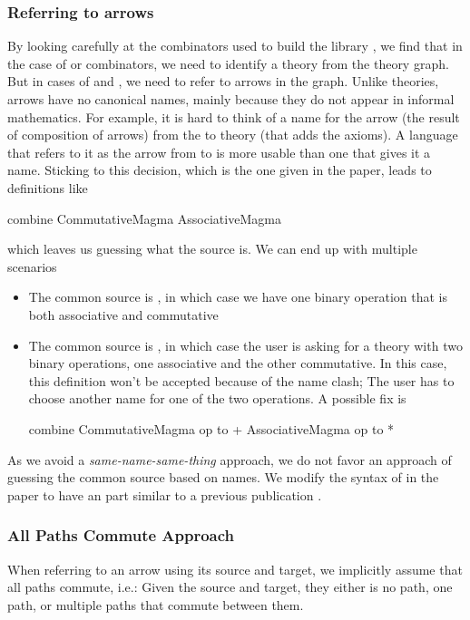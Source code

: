 \subsubsection{Referring to arrows}
By looking carefully at the combinators used to build the library , we find that in the case of  or  combinators, we need to identify a theory from the theory graph. But in cases of  and , we need to refer to arrows in the graph. Unlike theories, arrows have no canonical names, mainly because they do not appear in informal mathematics. For example, it is hard to think of a name for the arrow (the result of composition of arrows) from the  to  theory (that adds the axioms). A language that refers to it as the arrow from  to  is more usable than one that gives it a name. Sticking to this decision, which is the one given in the paper, leads to definitions like 
\begin{togcode}
combine CommutativeMagma {} AssociativeMagma {}
\end{togcode}
which leaves us guessing what the source is. We can end up with multiple scenarios 
\begin{itemize}
    \item The common source is , in which case we have one binary operation that is both associative and commutative 
    \item The common source is , in which case the user is asking for a theory with two binary operations, one associative and the other commutative. In this case, this definition won't be accepted because of the name clash; The user has to choose another name for one of the two operations. A possible fix is 
    \begin{togcode}
combine CommutativeMagma {op to +} AssociativeMagma {op to *}
    \end{togcode}
\end{itemize}

As we avoid a \emph{same-name-same-thing} approach, we do not favor an approach of guessing the common source based on names. We modify the syntax of  in the paper to have an  part similar to a previous publication \cite{CaretteOConnorTPC}. 

\subsubsection{All Paths Commute Approach} 
When referring to an arrow using its source and target, we implicitly assume that all paths commute, i.e.: Given the source and target, they either is no path, one path, or multiple paths that commute between them. 

